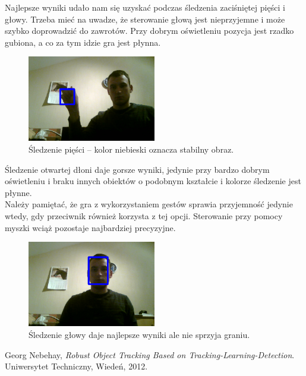 \documentclass{article}
\begin{document}
Najlepsze wyniki udało nam się uzyskać podczas śledzenia zaciśniętej pięści i głowy.
Trzeba mieć na uwadze, że sterowanie głową jest nieprzyjemne i może szybko doprowadzić do zawrotów.
Przy dobrym oświetleniu pozycja jest rzadko gubiona, a co za tym idzie gra jest płynna.

\begin{figure}[!ht]
\centering
\includegraphics[width=0.5\textwidth]{fist-blue.png}
\caption{Śledzenie pięści -- kolor niebieski oznacza stabilny obraz.}
\label{fig:fist-blue}
\end{figure}

Śledzenie otwartej dłoni daje gorsze wyniki, jedynie przy bardzo dobrym oświetleniu
i braku innych obiektów o podobnym kształcie i kolorze śledzenie jest płynne. \\

Należy pamiętać, że gra z wykorzystaniem gestów sprawia przyjemność jedynie wtedy,
gdy przeciwnik również korzysta z tej opcji.
Sterowanie przy pomocy myszki wciąż pozostaje najbardziej precyzyjne.

\begin{figure}[!ht]
\centering
\includegraphics[width=0.5\textwidth]{head-blue.png}
\caption{Śledzenie głowy daje najlepsze wyniki ale nie sprzyja graniu.}
\label{fig:head-blue}
\end{figure}

\begin{thebibliography}{9}

  Georg Nebehay,
  \emph{Robust Object Tracking Based on Tracking-Learning-Detection}.
  Uniwersytet Techniczny, Wiedeń,
  2012.

\end{thebibliography}
\end{document}
